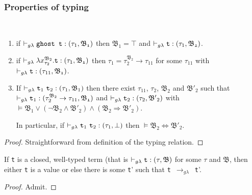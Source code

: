 \subsubsection{Properties of typing}
\begin{lemma}~\\
\vspace{-0.5cm}
\begin{enumerate}
	\item 
	if $\vdash_{g\lambda} \texttt{ghost t} : (\tau_{1}, \mathfrak{B_{1}})$ 
	then	$ \mathfrak{B_{1}} = \top $ 
	and $\vdash_{g\lambda} \texttt{t} : (\tau_{1}, \mathfrak{B_{2}}) $.
	
 	\item
 	if $\vdash_{g\lambda} \lambda x_{\tau_{2}}^{\mathfrak{B}_{2}}.\texttt{t} : (\tau_{1}, \mathfrak{B_{1}})$
 	then $\tau_{1} = \tau_{2}^{\mathfrak{B}_{2}} \rightarrow \tau_{11}$
 	for some $\tau_{11}$ with \mbox{$\vdash_{g\lambda} \texttt{t} : (\tau_{11}, \mathfrak{B_{1}}) $}.
  
 \item 
 	If ${\vdash_{g\lambda} \texttt{t}_{1}~ \texttt{t}_{2}  : (\tau_{1}, \mathfrak{B}_{1})}$
	then there exist $\tau_{11}$, $\tau_{2}$, $\mathfrak{B_{2}}$ and 	
	$\mathfrak{B'_{2}}$
	such that \\ 
	$\vdash_{g\lambda} \texttt{t}_{1} : (\tau_{2}^{\mathfrak{B}_{2}} \rightarrow \tau_{11}, \mathfrak{B_{1}})$
		and 
	${\vdash_{g\lambda} \texttt{t}_{2} : (\tau_{2}, \mathfrak{B'}_{2})}$ with \\
	 \quad
	\mbox{$\vDash \mathfrak{B}_{1} \vee (\neg \mathfrak{B}_{2} \wedge \mathfrak{B'}_{2} ) \wedge (\mathfrak{B}_{2} \Rightarrow \mathfrak{B'}_{2})$}. 
	
	In particular, if 
 		${\vdash_{g\lambda} \texttt{t}_{1}~ \texttt{t}_{2}  : (\tau_{1}, \bot)}$
then $\vDash \mathfrak{B_{2}} \Leftrightarrow \mathfrak{B'_{2}} $.
\end{enumerate}
\end{lemma} 
\begin{proof}
Straightforward from definition of the typing relation.
\end{proof}

\begin{lemma}[Progress] 
If \texttt{t} is a closed, well-typed term 
(that is ${\vdash_{g\lambda} \texttt{t} : (\tau, \mathfrak{B})}$ 
for some $\tau$ and $\mathfrak{B}$, 
then either \texttt{t} is a value or else there is some \texttt{t}' 
such that \mbox{\texttt{t} $\rightarrow_{g\lambda}$ \texttt{t}'}.
\end{lemma}
\begin{proof}
Admit.
\end{proof}

